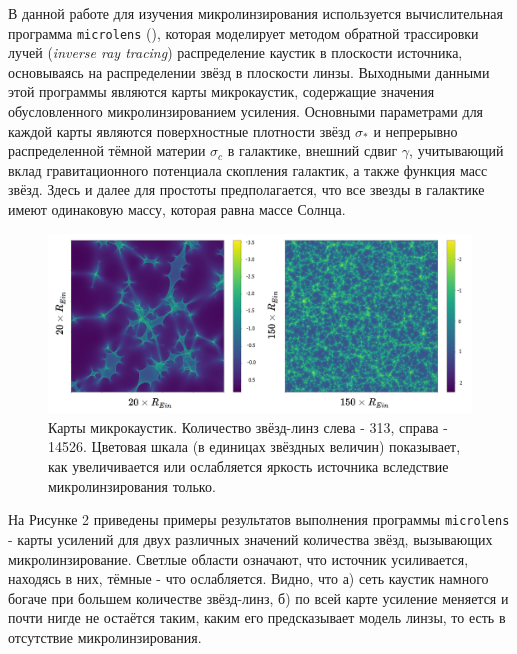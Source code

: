 В данной работе для изучения микролинзирования используется вычислительная программа {\tt{microlens}} (\cite{wambsganss1999}), которая моделирует методом обратной трассировки лучей (\textit{inverse ray tracing}) распределение каустик в плоскости источника, основываясь на распределении звёзд в плоскости линзы. Выходными данными этой программы являются карты микрокаустик, содержащие значения обусловленного микролинзированием усиления. Основными параметрами для каждой карты являются поверхностные плотности звёзд $\sigma_*$ и непрерывно распределенной тёмной материи $\sigma_c$ в галактике, внешний сдвиг $\gamma$, учитывающий вклад гравитационного потенциала скопления галактик, а также функция масс звёзд. Здесь и далее для простоты предполагается, что все звезды в галактике имеют одинаковую массу, которая равна массе Солнца. 

\begin{figure}[H]
    \centering
	\includegraphics[scale=0.25]{pics/maps_example.png}
	\caption{Карты микрокаустик. Количество звёзд-линз слева - 313, справа - 14526. Цветовая шкала (в единицах звёздных величин) показывает, как увеличивается или ослабляется яркость источника вследствие микролинзирования только.} 
\end{figure}

На Рисунке 2 приведены примеры результатов выполнения программы {\tt{microlens}} - карты усилений для двух различных значений количества звёзд, вызывающих микролинзирование. Светлые области означают, что источник усиливается, находясь в них, тёмные - что ослабляется. Видно, что а) сеть каустик намного богаче при большем количестве звёзд-линз, б) по всей карте усиление меняется и почти нигде не остаётся таким, каким его предсказывает модель линзы, то есть в отсутствие микролинзирования.
